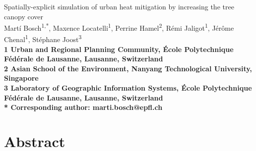 \documentclass[10pt,letterpaper]{article}
\begin{document}
\vspace*{0.35in}



\begin{flushleft}
{\Large Spatially-explicit simulation of urban heat mitigation by increasing the tree canopy cover
\textbf\newline{}
}
\newline
\\
Mart\'i Bosch\textsuperscript{1,*},
Maxence Locatelli\textsuperscript{1},
Perrine Hamel\textsuperscript{2},
R\'emi Jaligot\textsuperscript{1},
J\'er\^ome Chenal\textsuperscript{1},
St\'ephane Joost\textsuperscript{3}
\\
\bigskip
\bf{1} Urban and Regional Planning Community, \'Ecole Polytechnique F\'ed\'erale de Lausanne, Lausanne, Switzerland
\\ 
\bf{2} Asian School of the Environment, Nanyang Technological University, Singapore
\\
\bf{3} Laboratory of Geographic Information Systems, \'Ecole Polytechnique F\'ed\'erale de Lausanne, Lausanne, Switzerland
\\
\bigskip
\bf{*} Corresponding author: marti.bosch@epfl.ch

\end{flushleft}

\section*{Abstract}
\end{document}
